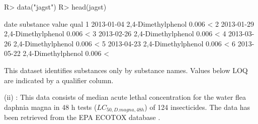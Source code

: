 \documentclass[article, shortnames]{jss}\usepackage[]{graphicx}\usepackage[]{color}
\providecommand{\DIFaddbegin}{} %
\providecommand{\DIFaddend}{} %
\providecommand{\DIFdelbegin}{} %
\providecommand{\DIFdelend}{} %
\begin{document}
\DIFdelbegin %
\DIFdelend \DIFaddbegin \begin{CodeChunk}
\begin{CodeInput}
R> data("jagst")
R> head(jagst)
\end{CodeInput}
\begin{CodeOutput}
        date          substance value qual
1 2013-01-04 2,4-Dimethylphenol 0.006    <
2 2013-01-29 2,4-Dimethylphenol 0.006    <
3 2013-02-26 2,4-Dimethylphenol 0.006    <
4 2013-03-26 2,4-Dimethylphenol 0.006    <
5 2013-04-23 2,4-Dimethylphenol 0.006    <
6 2013-05-22 2,4-Dimethylphenol 0.006    <
\end{CodeOutput}
\end{CodeChunk}
\DIFaddend 

This dataset identifies substances only by substance names. Values below LOQ are indicated by a qualifier column.

(ii) : This data consists of median acute lethal concentration for the water flea daphnia magna in 48 h tests ($LC_{50, D.magna, 48h}$) of 124 insecticides.
The data has been retrieved from the EPA ECOTOX database \citep{epa_2016}.
\end{document}
